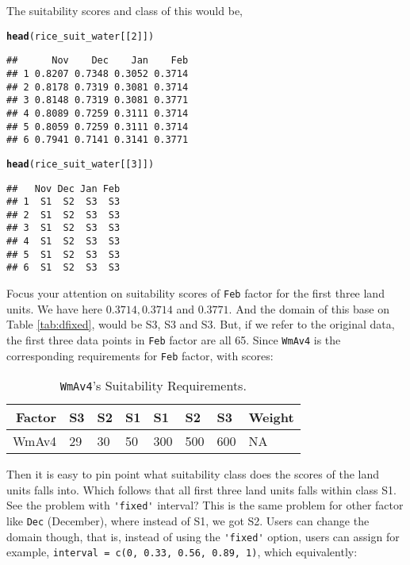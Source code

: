 \documentclass[11pt,fleqn]{article}\usepackage[]{graphicx}\usepackage[]{color}
\makeatletter
\newcommand{\hlnum}[1]{\textcolor[rgb]{0.686,0.059,0.569}{#1}}%
\newcommand{\hlstd}[1]{\textcolor[rgb]{0.345,0.345,0.345}{#1}}%
\newcommand{\hlkwd}[1]{\textcolor[rgb]{0.737,0.353,0.396}{\textbf{#1}}}%
\newenvironment{kframe}{%
 \def\at@end@of@kframe{}%
 \ifinner\ifhmode%
  \def\at@end@of@kframe{\end{minipage}}%
  \begin{minipage}{\columnwidth}%
 \fi\fi%
 \def\FrameCommand##1{\hskip\@totalleftmargin \hskip-\fboxsep
 \colorbox{shadecolor}{##1}\hskip-\fboxsep
     \hskip-\linewidth \hskip-\@totalleftmargin \hskip\columnwidth}%
 \MakeFramed {\advance\hsize-\width
   \@totalleftmargin\z@ \linewidth\hsize
   \@setminipage}}%
 {\par\unskip\endMakeFramed%
 \at@end@of@kframe}
\newenvironment{knitrout}{}{} %
\makeatother
\begin{document}
\noindent The suitability scores and class of this would be,
\begin{knitrout}
\color{fgcolor}\begin{kframe}
\begin{alltt}
\hlkwd{head}\hlstd{(rice_suit_water[[}\hlnum{2}\hlstd{]])}
\end{alltt}
\begin{verbatim}
##      Nov    Dec    Jan    Feb
## 1 0.8207 0.7348 0.3052 0.3714
## 2 0.8178 0.7319 0.3081 0.3714
## 3 0.8148 0.7319 0.3081 0.3771
## 4 0.8089 0.7259 0.3111 0.3714
## 5 0.8059 0.7259 0.3111 0.3714
## 6 0.7941 0.7141 0.3141 0.3771
\end{verbatim}
\begin{alltt}
\hlkwd{head}\hlstd{(rice_suit_water[[}\hlnum{3}\hlstd{]])}
\end{alltt}
\begin{verbatim}
##   Nov Dec Jan Feb
## 1  S1  S2  S3  S3
## 2  S1  S2  S3  S3
## 3  S1  S2  S3  S3
## 4  S1  S2  S3  S3
## 5  S1  S2  S3  S3
## 6  S1  S2  S3  S3
\end{verbatim}
\end{kframe}
\end{knitrout}
Focus your attention on suitability scores of \verb|Feb| factor for the first three land units. We have here $0.3714, 0.3714$ and $0.3771$. And the domain of this base on Table \ref{tab:dfixed}, would be S3, S3 and S3. But, if we refer to the original data, the first three data points in \verb|Feb| factor are all 65. Since \verb|WmAv4| is the corresponding requirements for \verb|Feb| factor, with scores:
\begin{table}[h]
\begin{tabular}{rlllllll}
\toprule
Factor&S3&S2&S1&S1&S2&S3&Weight\\
\midrule
WmAv4&29& 30& 50& 300& 500& 600& NA\\
\bottomrule
\end{tabular}
\caption{\texttt{WmAv4}'s Suitability Requirements.}
\label{tab:wmav4req}
\end{table}

Then it is easy to pin point what suitability class does the scores of the land units falls into. Which follows that all first three land units falls within class S1. See the problem with \verb|'fixed'| interval? This is the same problem for other factor like \verb|Dec| (December), where instead of S1, we got S2. Users can change the domain though, that is, instead of using the \verb|'fixed'| option, users can assign for example, \verb|interval = c(0, 0.33, 0.56, 0.89, 1)|, which equivalently:
\end{document}
